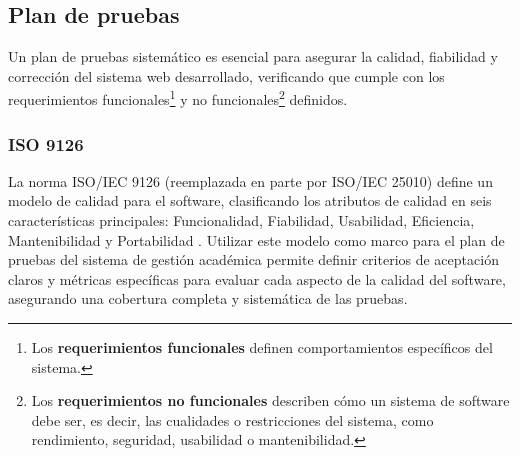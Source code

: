 \subsection{Plan de pruebas}
Un plan de pruebas sistemático es esencial para asegurar la calidad, fiabilidad y corrección del sistema web desarrollado, verificando que cumple con los requerimientos funcionales\footnote{Los \textbf{requerimientos funcionales} definen comportamientos específicos del sistema.} y no funcionales\footnote{Los \textbf{requerimientos no funcionales} describen cómo un sistema de software debe ser, es decir, las cualidades o restricciones del sistema, como rendimiento, seguridad, usabilidad o mantenibilidad.} definidos.

\subsubsection{ISO 9126}
La norma ISO/IEC 9126 (reemplazada en parte por ISO/IEC 25010) define un modelo de calidad para el software, clasificando los atributos de calidad en seis características principales: Funcionalidad, Fiabilidad, Usabilidad, Eficiencia, Mantenibilidad y Portabilidad \parencite{ISO9126}.
Utilizar este modelo como marco para el plan de pruebas del sistema de gestión académica permite definir criterios de aceptación claros y métricas específicas para evaluar cada aspecto de la calidad del software, asegurando una cobertura completa y sistemática de las pruebas.
